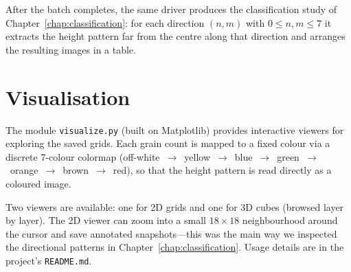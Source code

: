 \documentclass[main.tex]{subfiles}
\begin{document}
After the batch completes, the same driver produces the classification study of Chapter~\ref{chap:classification}: for each direction $(n,m)$ with $0 \le n,m \le 7$ it extracts the height pattern far from the centre along that direction and arranges the resulting images in a table.

\section{Visualisation}
\label{sec:visualisation}

The module \texttt{visualize.py} (built on Matplotlib) provides interactive viewers for exploring the saved grids. Each grain count is mapped to a fixed colour via a discrete 7-colour colormap (off-white~$\rightarrow$~yellow~$\rightarrow$~blue~$\rightarrow$~green~$\rightarrow$~orange~$\rightarrow$~brown~$\rightarrow$~red), so that the height pattern is read directly as a coloured image.

Two viewers are available: one for 2D grids and one for 3D cubes (browsed layer by layer). The 2D viewer can zoom into a small $18\times18$ neighbourhood around the cursor and save annotated snapshots---this was the main way we inspected the directional patterns in Chapter~\ref{chap:classification}. Usage details are in the project's \texttt{README.md}.
\end{document}
